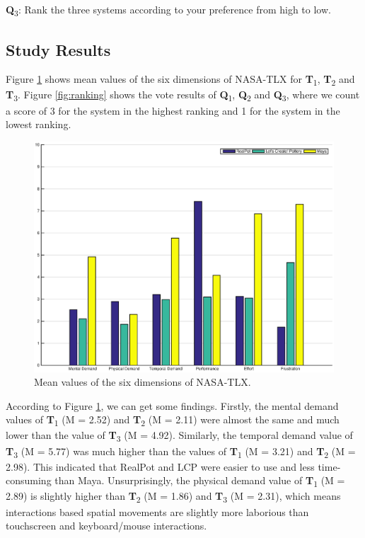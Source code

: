 \documentclass{svjour3}                     %
\begin{document}
\textbf{Q}\textsubscript{3}: Rank the three systems according to your preference from high to low.


\subsection{Study Results}
\label{sec:6.4}



Figure \ref{fig:tlx} shows mean values of the six dimensions of NASA-TLX for \textbf{T}\textsubscript{1}, \textbf{T}\textsubscript{2} and \textbf{T}\textsubscript{3}.
Figure \ref{fig:ranking} shows the vote results of \textbf{Q}\textsubscript{1}, \textbf{Q}\textsubscript{2} and \textbf{Q}\textsubscript{3}, where we count a score of 3 for the system in the highest ranking and 1 for the system in the lowest ranking. 

\begin{figure}
	\includegraphics[width=\textwidth]{fig14.eps}
	\caption{Mean values of the six dimensions of NASA-TLX.}
	\label{fig:tlx}
\end{figure}

According to Figure \ref{fig:tlx}, we can get some findings. 
Firstly, the mental demand values of \textbf{T}\textsubscript{1} (M = 2.52) and \textbf{T}\textsubscript{2} (M = 2.11) were almost the same and much lower than the value of \textbf{T}\textsubscript{3} (M = 4.92). Similarly, the temporal demand value of \textbf{T}\textsubscript{3} (M = 5.77) was much higher than the values of \textbf{T}\textsubscript{1} (M = 3.21) and \textbf{T}\textsubscript{2} (M = 2.98). This indicated that RealPot and LCP were easier to use and less time-consuming than Maya. Unsurprisingly, the physical demand value of \textbf{T}\textsubscript{1} (M = 2.89) is slightly higher than \textbf{T}\textsubscript{2} (M = 1.86) and \textbf{T}\textsubscript{3} (M = 2.31), which means interactions based spatial movements are slightly more laborious than touchscreen and keyboard/mouse interactions.
\end{document}
